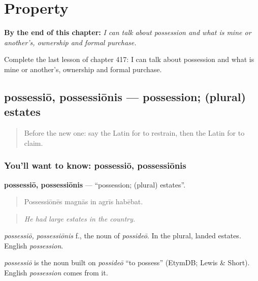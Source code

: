 
\chapter{Property}
\label{ch:la-property}

\begin{chapteropening}
\textbf{By the end of this chapter:} \emph{I can talk about possession and what is mine or another's, ownership and formal purchase.}

Complete the last lesson of chapter 417: I can talk about possession and what is mine or another's, ownership and formal purchase.
\end{chapteropening}

\section[possessiō, possessiōnis]{possessiō, possessiōnis — possession; (plural) estates}

\label{lesson:LA-C417-possessio}



\begin{quote}
Before the new one: say the Latin for to restrain, then the Latin for to claim.
\end{quote}

\subsection*{You'll want to know: possessiō, possessiōnis}
\textbf{possessiō, possessiōnis} — \textquotedblleft{}possession; (plural) estates\textquotedblright{}.

\begin{quote}
Possessiōnēs magnās in agrīs habēbat.
\end{quote}

\begin{quote}
\emph{He had large estates in the country.}
\end{quote}

\emph{possessiō, possessiōnis} f., the noun of \emph{possideō}. In the plural, landed estates. English \emph{possession}.

\begin{cousinweb}
\emph{possessiō} is the noun built on \emph{possideō} \textquotedblleft{}to possess\textquotedblright{} (EtymDB; Lewis \& Short). English \emph{possession} comes from it.
\end{cousinweb}

